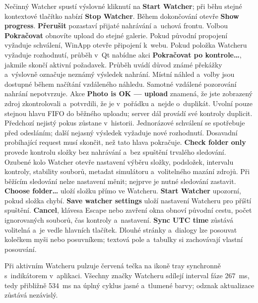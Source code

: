 \documentclass[11pt,a4paper]{article}
\newcommand{\ui}[1]{\textbf{#1}}
\begin{document}
Nečinný Watcher spustí výslovné kliknutí na \ui{Start Watcher}; při běhu stejné
kontextové tlačítko nabízí \ui{Stop Watcher}. Během dokončování otevře
\ui{Show progress}. \ui{Přerušit} pozastaví přijaté nahrávání a~uchová
frontu. Volbou \ui{Pokračovat} obnovíte upload do stejné galerie.
Pokud původní propojení vyžaduje schválení, WinApp otevře připojení k~webu.
Pokud položka Watcheru vyžaduje rozhodnutí, průběh v~Qt nabídne akci
\ui{Pokračovat po kontrole…}, jakmile skončí aktivní požadavek. Průběh
uvádí důvod známé překážky a~výslovně označuje neznámý výsledek nahrání.
Místní náhled a~volby jsou dostupné během načítání vzdáleného náhledu.
Samotné vzdálené pozorování nahrání nepotvrzuje.
Akce \ui{Photo is OK — upload} znamená, že jste zobrazený zdroj zkontrolovali
a~potvrdili, že je v~pořádku a~nejde o~duplikát. Uvolní pouze stejnou hlavu
FIFO do běžného uploadu; server dál provádí své kontroly duplicit.
Předchozí nejistý pokus zůstane v~historii. Jednorázové schválení se spotřebuje
před odesláním; další nejasný výsledek vyžaduje nové rozhodnutí. Dosavadní
probíhající request musí skončit, než tato hlava pokračuje.
\ui{Check folder only} provede
kontrolu složky bez nahrávání a~bez spuštění trvalého sledování. Ozubené kolo
Watcher otevře nastavení výběru složky, podsložek, intervalu kontroly, stability
souborů, metadat simulátoru
a~volitelného mazání zdrojů. Při běžícím sledování nelze nastavení měnit;
nejprve
je nutné sledování zastavit. \ui{Choose folder…} uloží složku přímo ve
Watcheru. \ui{Start Watcher} upozorní, pokud složka chybí.
\ui{Save watcher settings} uloží nastavení Watcheru pro příští spuštění.
\ui{Cancel}, klávesa Escape nebo zavření okna obnoví původní cestu,
počet ignorovaných souborů, čas kontroly a~nastavení.
\ui{Sync UTC time} zůstává volitelná a~je vedle hlavních tlačítek.
Dlouhé stránky a~dialogy lze posouvat kolečkem myši nebo posuvníkem; textová
pole a~tabulky si zachovávají vlastní posouvání.

Při aktivním Watcheru pulzuje červená tečka na ikoně tray synchronně
s~indikátorem v~aplikaci. Všechny značky Watcheru sdílejí interval fáze
267~ms, tedy přibližně 534~ms na úplný cyklus jasné a~tlumené barvy; odznak
aktualizace zůstává nezávislý.
\end{document}
